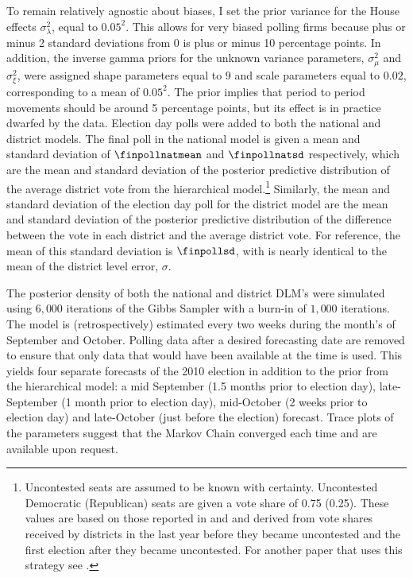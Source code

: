 \documentclass[12pt,final,fleqn]{article}
\theoremstyle{plain}
\begin{document}
To remain relatively agnostic about biases, I set the prior variance for the House effects $\sigma^2_\lambda$, equal to $0.05^2$. This allows for very biased polling firms because plus or minus 2 standard deviations from $0$ is plus or minus 10 percentage points. In addition, the inverse gamma priors for the unknown variance parameters, $\sigma_\mu^2$ and $\sigma_\xi^2$, were assigned shape parameters equal to $9$ and scale parameters equal to $0.02$, corresponding to a mean of $0.05^2$. The prior implies that period to period movements should be around 5 percentage points, but its effect is in practice dwarfed by the data. Election day polls were added to both the national and district models. The final poll in the national model is given a mean and standard deviation of $\finpollnatmean$ and  $\finpollnatsd$ respectively, which are the mean and standard deviation of the posterior predictive distribution of the average district vote from the hierarchical model.\footnote{Uncontested seats are assumed to be known with certainty. Uncontested Democratic (Republican) seats are given a vote share of 0.75 (0.25). These values are based on those reported in \citet{king1991systemic} and \citet{gelman1994unified} and derived from vote shares received by districts in the last year before they became uncontested and the first election after they became uncontested. For another paper that uses this strategy see \citet{kastellec2008predicting}.} Similarly, the mean and standard deviation of the election day poll for the district model are the mean and standard deviation of the posterior predictive distribution of the difference between the vote in each district and the average district vote. For reference, the mean of this standard deviation is $\finpollsd$, with is nearly identical to the mean of the district level error, $\sigma$.

The posterior density of both the national and district DLM's were simulated using $6,000$ iterations of the Gibbs Sampler with a burn-in of $1,000$ iterations. The model is (retrospectively) estimated every two weeks during the month's of September and October. Polling data after a desired forecasting date are removed to ensure that only data that would have been available at the time is used. This yields four separate forecasts of the 2010 election in addition to the prior from the hierarchical model: a mid September (1.5 months prior to election day), late-September (1 month prior to election day), mid-October (2 weeks prior to election day) and late-October (just before the election) forecast. Trace plots of the parameters suggest that the Markov Chain converged each time and are available upon request.
\end{document}

